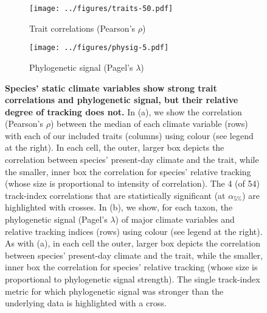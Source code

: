 \documentclass[12pt]{report}
\begin{document}
\clearpage
\begin{figure}[h!]
  \begin{center}
    \begin{subfigure}{.45\textwidth}
      \texttt{[image: ../figures/traits-50.pdf]}
      \caption{Trait correlations (Pearson's $\rho$)}
    \end{subfigure}
    \begin{subfigure}{.45\textwidth}
      \texttt{[image: ../figures/physig-5.pdf]}
      \caption{Phylogenetic signal (Pagel's $\lambda$)}
    \end{subfigure}
  \end{center}
  \caption{\textbf{Species' static climate variables show strong trait
      correlations and phylogenetic signal, but their relative degree
      of tracking does not.} In (a), we show the correlation
    (Pearson's $\rho$) between the median of each climate variable
    (rows) with each of our included traits (columns) using colour
    (see legend at the right). In each cell, the outer, larger box
    depicts the correlation between species' present-day climate and
    the trait, while the smaller, inner box the correlation for
    species' relative tracking (whose size is proportional to
    intensity of correlation). The 4 (of 54) track-index correlations
    that are statistically significant (at $\alpha_{5\%}$) are
    highlighted with crosses. In (b), we show, for each taxon, the
    phylogenetic signal (Pagel's $\lambda$\supercite{Pagel1999}) of
    major climate variables and relative tracking indices (rows) using
    colour (see legend at the right). As with (a), in each cell the
    outer, larger box depicts the correlation between species'
    present-day climate and the trait, while the smaller, inner box
    the correlation for species' relative tracking (whose size is
    proportional to phylogenetic signal strength). The single
    track-index metric for which phylogenetic signal was stronger than
    the underlying data is highlighted with a cross.}
  \label{traits-signal}
\end{figure}
\end{document}
